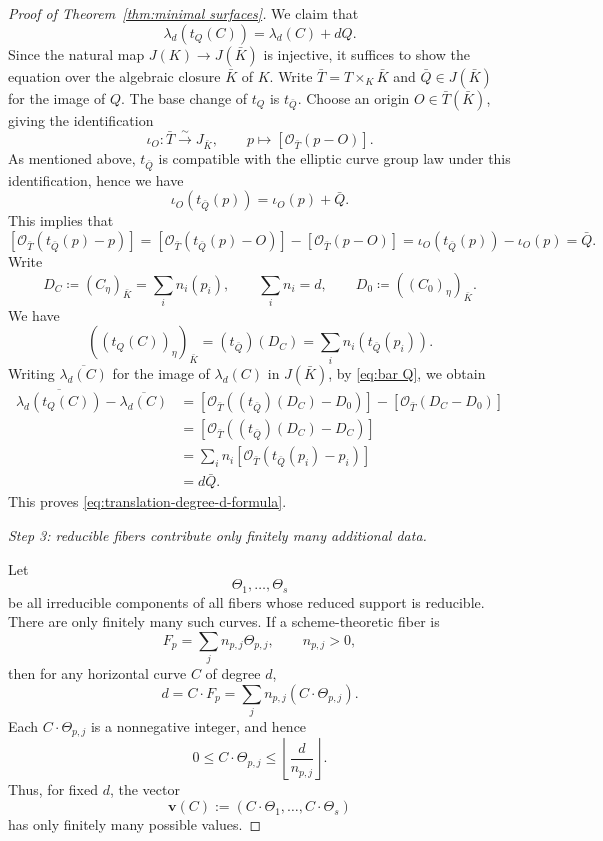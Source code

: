 \documentclass[12pt]{amsart}
\begin{document}
\begin{proof}[Proof of Theorem~\ref{thm:minimal surfaces}]
We claim that
\begin{equation}\label{eq:translation-degree-d-formula}
    \lambda_d(t_Q(C))=\lambda_d(C)+dQ.
\end{equation}
Since the natural map $J(K)\to J(\bar K)$ is injective, it suffices to show the equation over the algebraic closure $\bar K$ of $K$. Write
$\bar T=T\times_K\bar K$ and $\bar Q\in J(\bar K)$ for the
image of $Q$. The base change of $t_Q$ is $t_{\bar Q}$.
Choose an origin $O\in\bar T(\bar K)$, giving the identification
\[
    \iota_O:\bar T\xrightarrow{\sim}J_{\bar K},
    \qquad p\longmapsto[\mathcal O_{\bar T}(p-O)].
\]
As mentioned above, $t_{\bar Q}$ is compatible with the elliptic curve group law under this identification, hence we have
\[
    \iota_O(t_{\bar Q}(p))=\iota_O(p)+\bar Q.
\]
This implies that
\begin{equation}\label{eq:bar Q}
        [\mathcal O_{\bar T}(t_{\bar Q}(p)-p)]=[\mathcal O_{\bar T}(t_{\bar Q}(p)-O)]-[\mathcal O_{\bar T}(p-O)]
    =\iota_O(t_{\bar Q}(p))-\iota_O(p)
    =\bar Q.
\end{equation}
Write
\[
    D_C\coloneqq (C_\eta)_{\bar K}=\sum_i n_i(p_i),
    \qquad \sum_i n_i=d,
    \qquad D_0\coloneqq ((C_0)_\eta)_{\bar K}.
\]
We have
\[
    ((t_Q(C))_\eta)_{\bar K}
    =(t_{\bar Q})(D_C)
    =\sum_i n_i(t_{\bar Q}(p_i)).
\]
Writing $\overline{\lambda_d(C)}$ for the image of
$\lambda_d(C)$ in $J(\bar K)$, by \eqref{eq:bar Q}, we obtain
\[
\begin{aligned}
    \overline{\lambda_d(t_Q(C))}
        -\overline{\lambda_d(C)}
    &=
    [\mathcal O_{\bar T}((t_{\bar Q})(D_C)-D_0)]
        -[\mathcal O_{\bar T}(D_C-D_0)]\\
    &=
    [\mathcal O_{\bar T}((t_{\bar Q})(D_C)-D_C)]\\
    &=
    \sum_i n_i
    [\mathcal O_{\bar T}(t_{\bar Q}(p_i)-p_i)]\\
    &=d\bar Q.
\end{aligned}
\]
This proves \eqref{eq:translation-degree-d-formula}.


\medskip
\noindent
\textit{Step 3: reducible fibers contribute only finitely many additional data.}

Let
\[
    \Theta_1,\ldots,\Theta_s
\]
be all irreducible components of all fibers whose reduced support is
reducible.  There are only finitely many such curves.  If a scheme-theoretic
fiber is
\[
    F_p=\sum_j n_{p,j}\Theta_{p,j},
    \qquad n_{p,j}>0,
\]
then for any horizontal curve $C$ of degree $d$,
\begin{equation}\label{eq:component-intersection-profile}
    d=C\cdot F_p
      =\sum_j n_{p,j}(C\cdot\Theta_{p,j}).
\end{equation}
Each $C\cdot\Theta_{p,j}$ is a nonnegative integer, and hence
\[
    0\leq C\cdot\Theta_{p,j}
    \leq\left\lfloor\frac d{n_{p,j}}\right\rfloor.
\]
Thus, for fixed $d$, the vector
\begin{equation}\label{eq:fiber-component-profile}
    \mathbf v(C):=(C\cdot\Theta_1,\ldots,C\cdot\Theta_s)
\end{equation}
has only finitely many possible values.


\end{proof}
\end{document}
